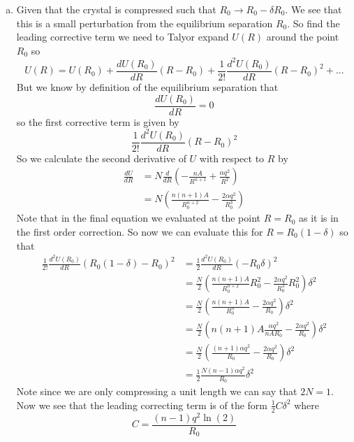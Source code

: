 \documentclass[11pt]{article}
\numberwithin{equation}{section}
\begin{document}
\begin{enumerate}[(a)]
\item
Given that the crystal is compressed such that $R_0\rightarrow R_0-\delta R_0$. We see that this is a small perturbation from the equilibrium separation $R_0$. So find the leading corrective term we need to Talyor expand $U(R)$ around the point $R_0$ so
$$U(R) = U(R_0) + \frac{dU(R_0)}{dR}(R-R_0) + \frac{1}{2!}\frac{d^2U(R_0)}{dR}(R-R_0)^2+...$$
But we know by definition of the equilibrium separation that 
$$\frac{dU(R_0)}{dR}=0$$
so the first corrective term is given by
$$\frac{1}{2!}\frac{d^2U(R_0)}{dR}(R-R_0)^2$$
So we calculate the second derivative of $U$ with respect to $R$ by
\begin{align*}
\frac{dU}{dR} &=  N\frac{d}{dR}\left(-\frac{nA}{R^{n+1}} + \frac{\alpha q^2}{R^2}\right)\\
&=  N\left(\frac{n(n+1)A}{R_0^{n+2}} - \frac{2\alpha q^2}{R_0^3}\right)
\end{align*}
Note that in the final equation we evaluated at the point $R=R_0$ as it is in the first order correction. So now we can evaluate this for $R=R_0(1-\delta)$ so that
\begin{align*}
\frac{1}{2!}\frac{d^2U(R_0)}{dR}(R_0(1-\delta)-R_0)^2 &= \frac{1}{2}\frac{d^2U(R_0)}{dR}(-R_0\delta)^2 \\
&= \frac{N}{2}\left(\frac{n(n+1)A}{R_0^{n+2}}R_0^2 - \frac{2\alpha q^2}{R_0^3}R_0^2\right)\delta^2 \\
&= \frac{N}{2}\left(\frac{n(n+1)A}{R_0^{n}} - \frac{2\alpha q^2}{R_0}\right)\delta^2 \\
&= \frac{N}{2}\left(n(n+1)A\frac{\alpha q^2}{nAR_0} - \frac{2\alpha q^2}{R_0}\right)\delta^2 \\
&= \frac{N}{2}\left(\frac{(n+1)\alpha q^2}{R_0} - \frac{2\alpha q^2}{R_0}\right)\delta^2 \\
&= \frac{1}{2}\frac{N(n-1)\alpha q^2}{R_0}\delta^2 
\end{align*}
Note since we are only compressing a unit length we can say that $2N=1$. Now we see that the leading correcting term is of the form $\frac{1}{2}C\delta^2$ where
$$C = \frac{(n-1)q^2\ln(2)}{R_0}$$
\end{enumerate}
\end{document}
